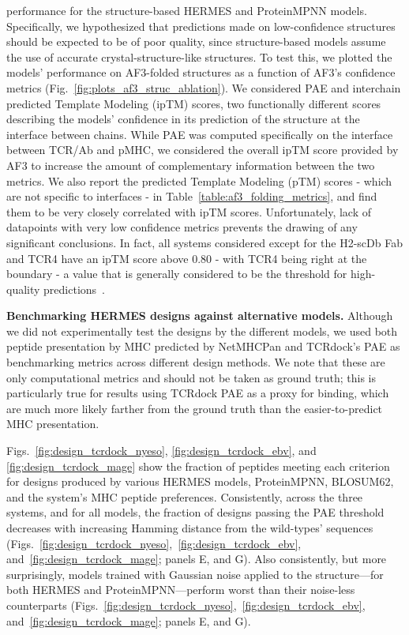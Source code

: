 performance for the structure-based HERMES and ProteinMPNN models. Specifically, we hypothesized
that predictions made on low-confidence structures should be expected to be of poor quality, since
structure-based models assume the use of accurate crystal-structure-like structures. To test this,
we plotted the models' performance on AF3-folded structures as a function of AF3's confidence
metrics (Fig.~\ref{fig:plots_af3_struc_ablation}). We considered PAE and interchain predicted
Template Modeling (ipTM) scores, two functionally different scores describing the models' confidence
in its prediction of the structure at the interface between chains. While PAE was computed
specifically on the interface between TCR/Ab and pMHC, we considered the overall ipTM score provided
by AF3 to increase the amount of complementary information between the two metrics. We also report
the predicted Template Modeling (pTM) scores - which are not specific to interfaces - in
Table~\ref{table:af3_folding_metrics}, and find them to be very closely correlated with ipTM scores.
Unfortunately, lack of datapoints with very low confidence metrics prevents the drawing of any
significant conclusions. In fact, all systems considered except for the H2-scDb Fab and TCR4 have an
ipTM score above 0.80 - with TCR4 being right at the boundary - a value that is generally considered
to be the threshold for high-quality predictions~\cite{Abramson2024-jp}.



\noindent \textbf{Benchmarking HERMES designs against alternative models.} Although we did not
experimentally test the designs by the different models, we used both peptide presentation by MHC
predicted by NetMHCPan and TCRdock’s PAE as benchmarking metrics across different design methods. We
note that these are only computational metrics and should not be taken as ground truth; this is
particularly true for results using TCRdock PAE as a proxy for binding, which are much more likely
farther from the ground truth than the easier-to-predict MHC presentation.

Figs.~\ref{fig:design_tcrdock_nyeso}, \ref{fig:design_tcrdock_ebv}, and
\ref{fig:design_tcrdock_mage} show the fraction of peptides meeting each criterion for designs
produced by various HERMES models, ProteinMPNN, BLOSUM62, and the system's MHC peptide preferences.
Consistently, across the three systems, and for all models, the fraction of designs passing the PAE
threshold decreases with increasing Hamming distance from the wild-types' sequences
(Figs.~\ref{fig:design_tcrdock_nyeso},~\ref{fig:design_tcrdock_ebv},
and~\ref{fig:design_tcrdock_mage}; panels E, and G). Also consistently, but more surprisingly,
models trained with Gaussian noise applied to the structure---for both HERMES and
ProteinMPNN---perform worst than their noise-less counterparts
(Figs.~\ref{fig:design_tcrdock_nyeso},~\ref{fig:design_tcrdock_ebv},
and~\ref{fig:design_tcrdock_mage}; panels E, and G).

